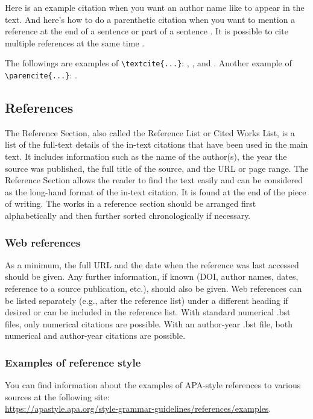 Here is an example citation when you want an author name like \textcite{collins2011a} to appear in the text. And here's how to do a parenthetic citation when you want to mention a reference at the end of a sentence or part of a sentence \parencite{collins2013}. It is possible to cite multiple references at the same time \parencite{collins2011b,collins2016,lunn2007a,lunn2007b,ross2006,shannon1948}.

The followings are examples of \verb+\textcite{...}+: \textcite{rahman2019centroidb}, \textcite{krizhevsky2012imagenet, horvath2018dna}, and \textcite{lecun2015deep, zhang2018fine, ravi2016deep}. Another example of \verb+\parencite{...}+: \parencite{bahdanau2014neural,imboden2018cardiorespiratory,motiian2017unified,murphy2012machine,ji20123d}.

\subsection{References}
The Reference Section, also called the Reference List or Cited Works List, is a list of the full-text details of the in-text citations that have been used in the main text. It includes information such as the name of the author(s), the year the source was published, the full title of the source, and the URL or page range. The Reference Section allows the reader to find the text easily and can be considered as the long-hand format of the in-text citation. It is found at the end of the piece of writing. The works in a reference section should be arranged first alphabetically and then further sorted chronologically if necessary.

\subsubsection{Web references}
As a minimum, the full URL and the date when the reference was last accessed should be given. Any further information, if known (DOI, author names, dates, reference to a source publication, etc.), should also be given. Web references can be listed separately (e.g., after the reference list) under a different heading if desired or can be included in the reference list. With standard numerical .bst files, only numerical citations are possible. With an author-year .bst file, both numerical and author-year citations are possible. 

\subsubsection{Examples of reference style}
You can find information about the examples of APA-style references to various sources at the following site:\\
\url{https://apastyle.apa.org/style-grammar-guidelines/references/examples}.


